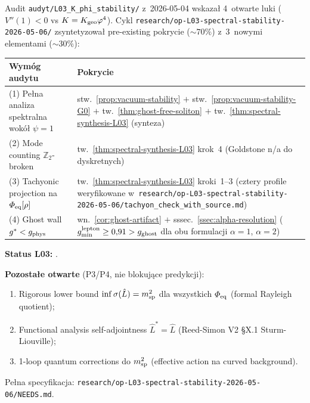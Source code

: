\begin{remark}\label{rem:L03-closure}
Audit \texttt{audyt/L03\_K\_phi\_stability/} z~2026-05-04 wskaza\l{}
4~otwarte luki ($V''(1)<0$ vs $K=K_{\rm geo}\varphi^4$). Cykl
\texttt{research/op-L03-spectral-stability-2026-05-06/} zsyntetyzowa\l{}
pre-existing pokrycie ($\sim 70\%$) z~3~nowymi elementami ($\sim 30\%$):

\medskip
\begin{center}\small
\begin{tabular}{@{}p{6cm}p{8cm}@{}}
\toprule
\textbf{Wym\'og audytu} & \textbf{Pokrycie} \\
\midrule
(1) Pe\l{}na analiza spektralna wok\'o\l{} $\psi=1$
  & stw.~\ref{prop:vacuum-stability} $+$
    stw.~\ref{prop:vacuum-stability-G0} $+$
    tw.~\ref{thm:ghost-free-soliton} $+$
    tw.~\ref{thm:spectral-synthesis-L03} (synteza) \\[3pt]
(2) Mode counting $\mathbb{Z}_2$-broken
  & tw.~\ref{thm:spectral-synthesis-L03} krok~4
    (Goldstone n/a do dyskretnych) \\[3pt]
(3) Tachyonic projection na $\Phi_{\rm eq}[\rho]$
  & tw.~\ref{thm:spectral-synthesis-L03} kroki~1--3
    (cztery profile weryfikowane w~\texttt{research/op-L03-spectral-stability-2026-05-06/tachyon\_check\_with\_source.md}) \\[3pt]
(4) Ghost wall $g^* < g_{\rm phys}$
  & wn.~\ref{cor:ghost-artifact} $+$
    sssec.~\ref{ssec:alpha-resolution}
    ($g_{\min}^{\rm lepton} \geq 0{,}91 > g_{\rm ghost}$
    dla obu formulacji $\alpha=1$, $\alpha=2$) \\
\bottomrule
\end{tabular}
\end{center}

\medskip\noindent
\textbf{Status L03:}
.

\medskip\noindent
\textbf{Pozosta\l{}e otwarte} (P3/P4, nie blokuj\k{a}ce predykcji):
\begin{enumerate}[nosep]
  \item Rigorous lower bound $\inf\sigma(\hat{L}) = m_{\rm sp}^2$
    dla wszystkich $\Phi_{\rm eq}$ (formal Rayleigh quotient);
  \item Functional analysis self-adjointness $\hat{L}^* = \hat{L}$
    (Reed-Simon V2 \S X.1 Sturm-Liouville);
  \item 1-loop quantum corrections do $m_{\rm sp}^2$
    (effective action na curved background).
\end{enumerate}

Pe\l{}na specyfikacja: \texttt{research/op-L03-spectral-stability-2026-05-06/NEEDS.md}.
\end{remark}
